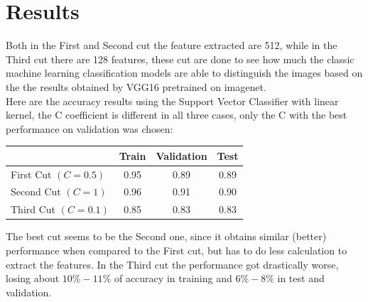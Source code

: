 \documentclass[11pt]{article}
\begin{document}
\section*{Results}
Both in the First and Second cut the feature extracted are 512, while in the Third cut there are 128 features, these cut are done to see how much the classic machine learning classification models are able to distinguish the images based on the the results obtained by VGG16 pretrained on imagenet.\\
Here are the accuracy results using the Support Vector Classifier with linear kernel, the C coefficient is different in all three cases, only the C with the best performance on validation was chosen:
\begin{center}
  \begin{tabular}{|l|c|c|c|}
    \hline
    & Train & Validation & Test\\
    \hline
    First Cut $(C=0.5)$ & 0.95 & 0.89 & 0.89\\
    \hline
    Second Cut $(C=1)$ & 0.96 & 0.91 & 0.90\\
    \hline
    Third Cut $(C=0.1)$ & 0.85 & 0.83 & 0.83\\
    \hline
  \end{tabular}
\end{center}
The best cut seems to be the Second one, since it obtains similar (better) performance when compared to the First cut, but has to do less calculation to extract the features. In the Third cut the performance got drastically worse, losing about $10\%-11\%$ of accuracy in training and $6\%-8\%$ in test and validation. 
\end{document}
